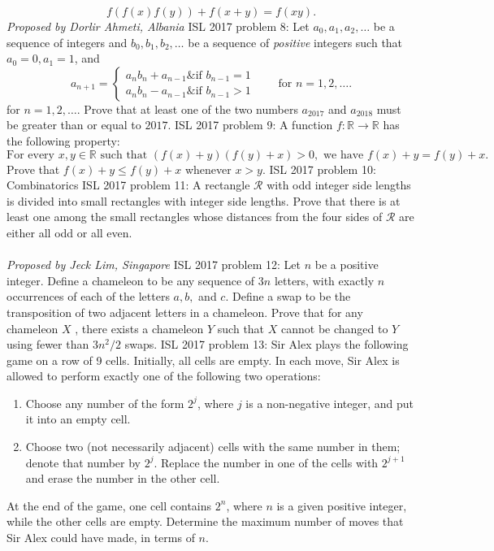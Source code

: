\[ f(f(x)f(y)) + f(x+y) = f(xy). \]
\textit{Proposed by Dorlir Ahmeti, Albania} 
ISL 2017 problem 8:  Let $a_0,a_1,a_2,\ldots$ be a sequence of integers and $b_0,b_1,b_2,\ldots$ be a sequence of \textit{positive} integers such that $a_0=0,a_1=1$, and
\[
a_{n+1} =
\begin{cases}
            a_nb_n+a_{n-1} \& \text{if $b_{n-1}=1$} \\
            a_nb_n-a_{n-1} \& \text{if $b_{n-1}>1$}
        \end{cases}
\qquad\text{for }n=1,2,\ldots.
\]
for $n=1,2,\ldots.$ Prove that at least one of the two numbers $a_{2017}$ and $a_{2018}$ must be greater than or equal to $2017$. 
ISL 2017 problem 9:  A function $f:\mathbb{R} \to \mathbb{R}$ has the following property:
\[
\text{For every } x,y \in \mathbb{R} \text{ such that }(f(x)+y)(f(y)+x) > 0, \text{ we have } f(x)+y = f(y)+x.
\]
Prove that $f(x)+y \leq f(y)+x$ whenever $x>y$. 
ISL 2017 problem 10:  Combinatorics 
ISL 2017 problem 11:  A rectangle $\mathcal{R}$ with odd integer side lengths is divided into small rectangles with integer side lengths. Prove that there is at least one among the small rectangles whose distances from the four sides of $\mathcal{R}$ are either all odd or all even. \\\\
\textit{Proposed by Jeck Lim, Singapore} 
ISL 2017 problem 12:  Let $n$ be a positive integer. Define a chameleon to be any sequence of $3n$ letters, with exactly $n$ occurrences of each of the letters $a, b,$ and $c$. Define a swap to be the transposition of two adjacent letters in a chameleon. Prove that for any chameleon $X$ , there exists a chameleon $Y$ such that $X$ cannot be changed to $Y$ using fewer than $3n^2/2$ swaps. 
ISL 2017 problem 13:  Sir Alex plays the following game on a row of 9 cells. Initially, all cells are empty. In each move, Sir Alex is allowed to perform exactly one of the following two operations:
\begin{enumerate}
  \item Choose any number of the form $2^j$, where $j$ is a non-negative integer, and put it into an empty cell.
  \item Choose two (not necessarily adjacent) cells with the same number in them; denote that number by $2^j$. Replace the number in one of the cells with $2^{j+1}$ and erase the number in the other cell.
\end{enumerate}
At the end of the game, one cell contains $2^n$, where $n$ is a given positive integer, while the other cells are empty. Determine the maximum number of moves that Sir Alex could have made, in terms of $n$. \\\\

